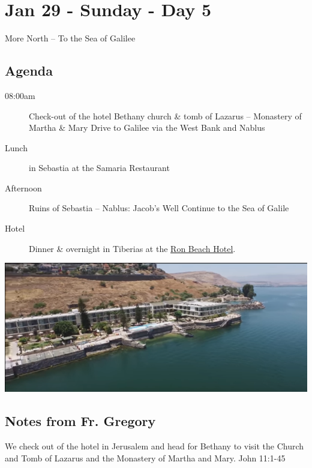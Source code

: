 \documentclass[letterpaper]{report}
\begin{document}

\clearpage

\clearpage
\section{Jan 29 - Sunday - Day 5}
More North -- To the Sea of Galilee
\subsection{Agenda}
\begin{description}
	\item[08:00am] Check-out of the hotel Bethany
	  \subitem church \& tomb of Lazarus – Monastery of Martha \& Mary
	  \subitem Drive to Galilee via the West Bank and Nablus
	\item[Lunch] in Sebastia at the Samaria Restaurant
	\item[Afternoon] Ruins of Sebastia – Nablus: Jacob’s Well
	  \subitem Continue to the Sea of Galile
	\item[Hotel] Dinner \& overnight in Tiberias at the
	  \href{http://www.ronbeachhotel.com/}{Ron Beach Hotel}.
\end{description}

\includegraphics[width=\textwidth]{RonBeachHotel}

\subsection{Notes from Fr. Gregory}
We check out of the hotel in Jerusalem and head for Bethany to visit the 
Church and Tomb of Lazarus and the Monastery of Martha and Mary.
John 11:1-45
\end{document}

